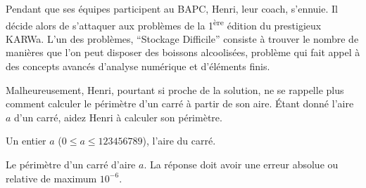 \problemname{\problemyamlname}


\newcommand{\maxa}{123456789}

Pendant que ses équipes participent au BAPC, Henri, leur coach, s'ennuie.
Il décide alors de s'attaquer aux problèmes de la 1\textsuperscript{ère} édition du prestigieux KARWa.
L'un des problèmes, ``Stockage Difficile'' consiste à trouver le nombre de manières que l'on peut disposer des boissons alcoolisées, problème qui fait appel à des concepts avancés d'analyse numérique et d'éléments finis.

Malheureusement, Henri, pourtant si proche de la solution, ne se rappelle plus comment calculer le périmètre d'un carré à partir de son aire.
Étant donné l'aire $a$ d'un carré, aidez Henri à calculer son périmètre.

\begin{Input}
	Un entier $a$ ($0 \le a \le \maxa$), l'aire du carré.
\end{Input}

\begin{Output}
	Le périmètre d'un carré d'aire $a$.
	La réponse doit avoir une erreur absolue ou relative de maximum $10^{-6}$.
\end{Output}
